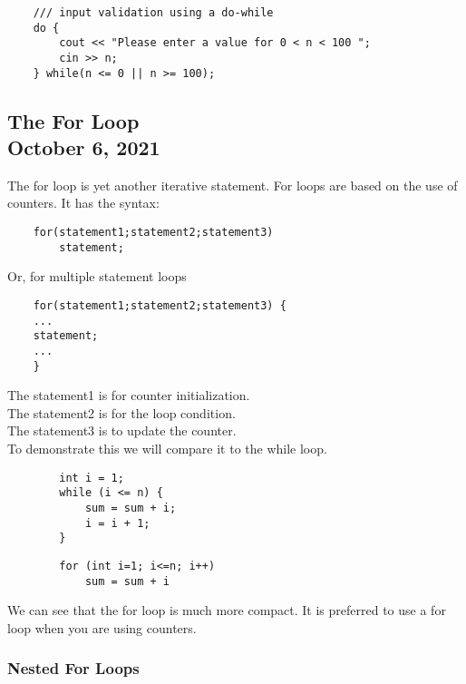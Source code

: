 \documentclass[]{article}
\begin{document}
\begin{lstlisting}
	/// input validation using a do-while
	do {
		cout << "Please enter a value for 0 < n < 100 ";
		cin >> n;
	} while(n <= 0 || n >= 100);
\end{lstlisting}\bigbreak


\subsection{The For Loop\\ {\large \normalfont October 6, 2021}}
\bigbreak

The for loop is yet another iterative statement. For loops are based on the use of counters. It has the syntax:

\begin{lstlisting}
	for(statement1;statement2;statement3)
		statement;
\end{lstlisting}\bigbreak

Or, for multiple statement loops

\begin{lstlisting}
	for(statement1;statement2;statement3) {
	...
	statement;
	...
	}
\end{lstlisting}\bigbreak

The statement1 is for counter initialization.\\
The statement2 is for the loop condition.\\
The statement3 is to update the counter.\\

To demonstrate this we will compare it to the while loop.

\begin{minipage}[t]{0.5\textwidth}
	\begin{lstlisting}
		int i = 1;
		while (i <= n) {
			sum = sum + i;
			i = i + 1;
		}
	\end{lstlisting}
\end{minipage}
\begin{minipage}[t]{0.5\textwidth}
	\begin{lstlisting}
		for (int i=1; i<=n; i++)
			sum = sum + i
	\end{lstlisting}
\end{minipage}


We can see that the for loop is much more compact. It is preferred to use a for loop when you are using counters.\\

\bigbreak
\subsubsection{Nested For Loops}
\bigbreak
\end{document}
